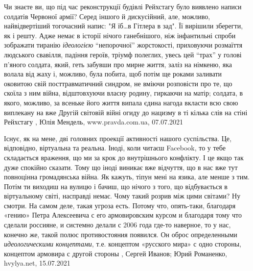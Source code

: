 Чи знаєте ви, що під час реконструкції будівлі Рейхстагу було виявлено написи
солдатів Червоної армії? Серед іншого й дискусійний, але, можливо,
найвідвертіший тогочасний напис: "Я їб…в Гітлера в зад". Її вирішили зберегти,
як і решту.  Адже немає в історії нічого ганебнішого, ніж інфантильні спроби
зображати тиранію \emph{ідеологією} \enquote{непорочної} жорстокості,
приховуючи розмаїття людського свавілля, падіння героїв, тріумф полеглих, увесь
цей \enquote{трах} у голові п’яного солдата, який, геть забувши про мирне
життя, заліз на німкеню, яка волала від жаху і, можливо, була побита, щоб потім
ще роками заливати оковитою свій посттравматичний синдром, не вміючи розповісти
про те, що скоїла з ним війна, відштовхуючи власну родину, гиркаючи на матір;
солдата, в якого, можливо, за всеньке його життя випала єдина нагода вкласти
всю свою виплекану на вже Другій світовій війні огиду до нацизму в ті кілька
слів на стіні Рейхстагу
, 
Юлія Мендель, www.pravda.com.ua, 07.07.2021

Існує, як на мене, дві головних проекції активності нашого суспільства. Це,
відповідно, віртуальна та реальна. Іноді, коли читаєш Facebook, то у тебе
складається враження, що ми за крок до внутрішнього конфлікту. І це якщо так
дуже спокійно сказати.  Тому що іноді виникає вже відчуття, що в нас вже тут
повноцінна громадянська війна. Як кажуть, тіпун мені на язика, але менше з тим.
Потім ти виходиш на вулицю і бачиш, що нічого з того, що відбувається в
віртуальному світі, насправді немає. Чому такий розрив між цими світами?  Ну
смотри. На самом деле, такая угроза есть. Потому что, опять-таки, благодаря
«гению» Петра Алексеевича с его армовировским курсом и благодаря тому что
сделали россияне, и системно делали с 2006 года где-то наверное, то у нас,
конечно же, такой полюс противостояния появился. Он оброс определенными
\emph{идеологическими концептами}, т.е. концептом «русского мира» с одно стороны,
концептом армовира с другой стороны
, 
Сергей Иванов; Юрий Романенко, hvylya.net, 15.07.2021

